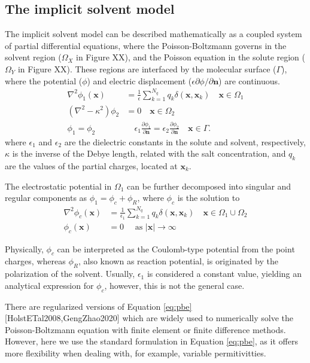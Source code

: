 \subsection*{\sffamily \large The implicit solvent model}

The implicit solvent model can be described mathematically as a coupled system of partial differential equations, where the Poisson-Boltzmann governs in the solvent region ($\Omega_X$ in Figure XX), and the Poisson equation in the solute region ($\Omega_Y$ in Figure XX). These regions are interfaced by the molecular surface ($\Gamma$), where the potential ($\phi$) and electric displacement ($\epsilon\partial\phi/\partial\mathbf{n}$) are continuous. 
%
\begin{align}\label{eq:pbe}
\nabla^2\phi_1(\mathbf{x}) &= \frac{1}{\epsilon}\sum_{k=1}^{N_q} q_k\delta(\mathbf{x},\mathbf{x}_k) \quad  \mathbf{x} \in \Omega_1\nonumber\\
\left(\nabla^2 - \kappa^2\right)\phi_2 &= 0 \quad\mathbf{x}\in\Omega_2\nonumber\\
\phi_1 = \phi_2 &\quad \epsilon_1\frac{\partial\phi_1}{\partial\mathbf{n}} = \epsilon_2\frac{\partial\phi_2}{\partial\mathbf{n}} \quad \mathbf{x}\in \Gamma. 
\end{align}
%
where $\epsilon_1$ and $\epsilon_2$ are the dielectric constants in the solute and solvent, respectively, $\kappa$ is the inverse of the Debye length, related with the salt concentration, and $q_k$ are the values of the partial charges, located at $\mathbf{x}_k$.

The electrostatic potential in $\Omega_1$ can be further decomposed into singular and regular components as $\phi_1 = \phi_c + \phi_R$, where $\phi_c$ is the solution to
%
\begin{align}\label{eq:phic}
\nabla^2\phi_c(\mathbf{x}) &= \frac{1}{\epsilon_1}\sum_{k=1}^{N_q}q_k\delta(\mathbf{x},\mathbf{x}_k) \quad \mathbf{x}\in\Omega_1\cup\Omega_2\nonumber\\
\phi_c(\mathbf{x})&=0 \quad \text{ as } |\mathbf{x}|\to\infty
\end{align}

Physically, $\phi_c$ can be interpreted as the Coulomb-type potential from the point charges, whereas $\phi_R$, also known as reaction potential, is originated by the polarization of the solvent. 
Usually, $\epsilon_1$ is considered a constant value, yielding an analytical expression for $\phi_c$, however, this is not the general case.

There are regularized versions of Equation \eqref{eq:pbe} [HolstETal2008,GengZhao2020] which are widely used to numerically solve the Poisson-Boltzmann equation with finite element or finite difference methods.
However, here we use the standard formulation in Equation \eqref{eq:pbe}, as it offers more flexibility when dealing with, for example, variable permitivitties.

